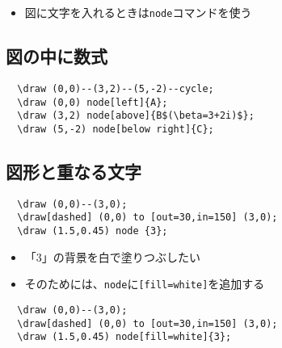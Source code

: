 \documentclass[16pt,b5paper]{article}
\begin{document}
\begin{itemize}
  \item 図に文字を入れるときは\verb|node|コマンドを使う
\end{itemize}

\subsection{図の中に数式}


\begin{lstlisting}
  \draw (0,0)--(3,2)--(5,-2)--cycle;
  \draw (0,0) node[left]{A};
  \draw (3,2) node[above]{B$(\beta=3+2i)$};
  \draw (5,-2) node[below right]{C};
\end{lstlisting}

\subsection{図形と重なる文字}


\begin{lstlisting}
  \draw (0,0)--(3,0);
  \draw[dashed] (0,0) to [out=30,in=150] (3,0);
  \draw (1.5,0.45) node {3};
\end{lstlisting}

\begin{itemize}
  \item 「3」の背景を白で塗りつぶしたい
  \item そのためには、\verb|node|に\verb|[fill=white]|を追加する
\end{itemize}


\begin{lstlisting}
  \draw (0,0)--(3,0);
  \draw[dashed] (0,0) to [out=30,in=150] (3,0);
  \draw (1.5,0.45) node[fill=white]{3};
\end{lstlisting}
\end{document}
